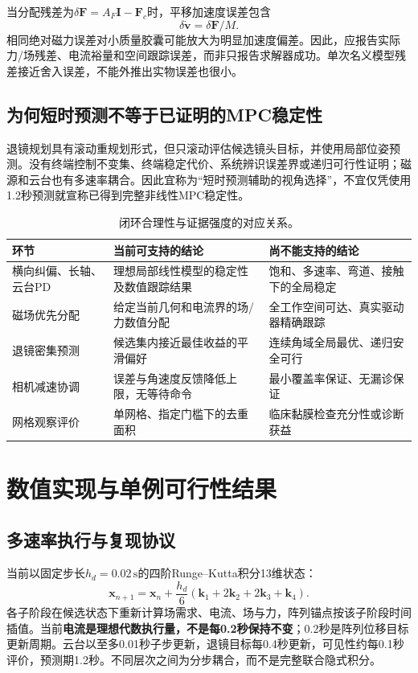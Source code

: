 \documentclass[UTF8,a4paper,zihao=5,fontset=windows]{ctexart}
\newcommand{\vect}[1]{\bm{#1}}
\newcommand{\unit}[1]{\,\mathrm{#1}}
\begin{document}
当分配残差为$\delta\vect F=A_F\vect I-\vect F_c$时，平移加速度误差包含
\begin{equation}
\delta\dot{\vect v}=\delta\vect F/M.
\label{eq:force_residual}
\end{equation}
相同绝对磁力误差对小质量胶囊可能放大为明显加速度偏差。因此，应报告实际力/场残差、电流裕量和空间跟踪误差，而非只报告求解器成功。单次名义模型残差接近舍入误差，不能外推出实物误差也很小。

\subsection{为何短时预测不等于已证明的MPC稳定性}
退镜规划具有滚动重规划形式，但只滚动评估候选镜头目标，并使用局部位姿预测。没有终端控制不变集、终端稳定代价、系统辨识误差界或递归可行性证明；磁源和云台也有多速率耦合。因此宜称为“短时预测辅助的视角选择”，不宜仅凭使用1.2秒预测就宣称已得到完整非线性MPC稳定性。

\begin{table}[htbp]
\centering\small\caption{闭环合理性与证据强度的对应关系。}
\begin{tabularx}{\linewidth}{p{.20\linewidth}XX}
\toprule 环节 & 当前可支持的结论 & 尚不能支持的结论\\\midrule
横向纠偏、长轴、云台PD & 理想局部线性模型的稳定性及数值跟踪结果 & 饱和、多速率、弯道、接触下的全局稳定\\
磁场优先分配 & 给定当前几何和电流界的场/力数值分配 & 全工作空间可达、真实驱动器精确跟踪\\
退镜密集预测 & 候选集内接近最佳收益的平滑偏好 & 连续角域全局最优、递归安全可行\\
相机减速协调 & 误差与角速度反馈降低上限，无等待命令 & 最小覆盖率保证、无漏诊保证\\
网格观察评价 & 单网格、指定门槛下的去重面积 & 临床黏膜检查充分性或诊断获益\\
\bottomrule\end{tabularx}
\end{table}

\section{数值实现与单例可行性结果}
\subsection{多速率执行与复现协议}
当前以固定步长$h_d=0.02\unit s$的四阶Runge--Kutta积分13维状态：
\begin{equation}
\vect x_{n+1}=\vect x_n+\frac{h_d}{6}(\vect k_1+2\vect k_2+2\vect k_3+\vect k_4).
\label{eq:rk4}
\end{equation}
各子阶段在候选状态下重新计算场需求、电流、场与力，阵列锚点按该子阶段时间插值。当前\textbf{电流是理想代数执行量，不是每0.2秒保持不变}；0.2秒是阵列位移目标更新周期。云台以至多0.01秒子步更新，退镜目标每0.4秒更新，可见性约每0.1秒评价，预测期1.2秒。不同层次之间为分步耦合，而不是完整联合隐式积分。
\end{document}
